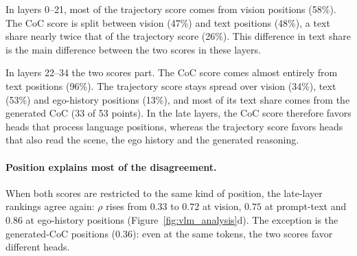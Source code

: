 In layers 0--21, most of the trajectory score comes from vision positions
(58\%). The CoC score is split between vision (47\%) and text positions (48\%),
a text share nearly twice that of the trajectory score (26\%). This difference
in text share is the main difference between the two scores in these layers.

In layers 22--34 the two scores part. The CoC score comes almost entirely from
text positions (96\%). The trajectory score stays spread over vision (34\%),
text (53\%) and ego-history positions (13\%), and most of its text share comes
from the generated CoC (33 of 53 points).
In the late layers, the CoC score therefore favors heads that process language
positions, whereas the trajectory score favors heads that also read the scene,
the ego history and the generated reasoning.

\paragraph{Position explains most of the disagreement.}
When both scores are restricted to the same kind of position, the late-layer
rankings agree again: $\rho$ rises from $0.33$ to $0.72$ at vision, $0.75$ at
prompt-text and $0.86$ at ego-history positions (Figure~\ref{fig:vlm_analysis}d).
The exception is the generated-CoC positions ($0.36$): even at the same tokens,
the two scores favor different heads.

